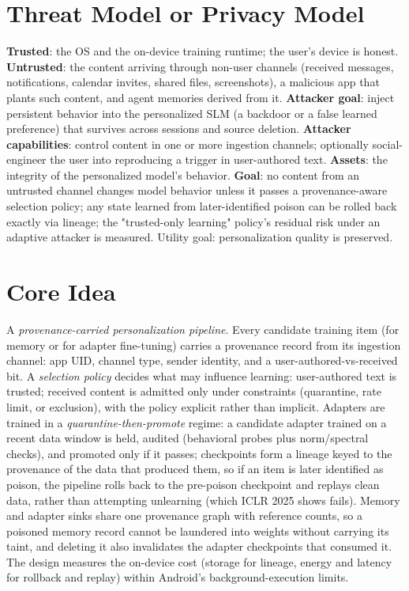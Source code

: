 \documentclass[11pt]{article}
\begin{document}
\section{Threat Model or Privacy Model}
\textbf{Trusted}: the OS and the on-device training runtime; the user's device is honest. \textbf{Untrusted}: the content arriving through non-user channels (received messages, notifications, calendar invites, shared files, screenshots), a malicious app that plants such content, and agent memories derived from it. \textbf{Attacker goal}: inject persistent behavior into the personalized SLM (a backdoor or a false learned preference) that survives across sessions and source deletion. \textbf{Attacker capabilities}: control content in one or more ingestion channels; optionally social-engineer the user into reproducing a trigger in user-authored text. \textbf{Assets}: the integrity of the personalized model's behavior. \textbf{Goal}: no content from an untrusted channel changes model behavior unless it passes a provenance-aware selection policy; any state learned from later-identified poison can be rolled back exactly via lineage; the "trusted-only learning" policy's residual risk under an adaptive attacker is measured. Utility goal: personalization quality is preserved.

\section{Core Idea}
A \emph{provenance-carried personalization pipeline}. Every candidate training item (for memory or for adapter fine-tuning) carries a provenance record from its ingestion channel: app UID, channel type, sender identity, and a user-authored-vs-received bit. A \emph{selection policy} decides what may influence learning: user-authored text is trusted; received content is admitted only under constraints (quarantine, rate limit, or exclusion), with the policy explicit rather than implicit. Adapters are trained in a \emph{quarantine-then-promote} regime: a candidate adapter trained on a recent data window is held, audited (behavioral probes plus norm/spectral checks), and promoted only if it passes; checkpoints form a lineage keyed to the provenance of the data that produced them, so if an item is later identified as poison, the pipeline rolls back to the pre-poison checkpoint and replays clean data, rather than attempting unlearning (which ICLR 2025 shows fails). Memory and adapter sinks share one provenance graph with reference counts, so a poisoned memory record cannot be laundered into weights without carrying its taint, and deleting it also invalidates the adapter checkpoints that consumed it. The design measures the on-device cost (storage for lineage, energy and latency for rollback and replay) within Android's background-execution limits.
\end{document}

